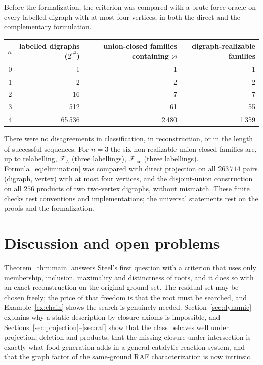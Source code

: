 \documentclass[11pt,a4paper]{article}
\theoremstyle{plain}
\theoremstyle{definition}
\theoremstyle{remark}
\newcommand{\cF}{\mathcal F}
\begin{document}
Before the formalization, the criterion was compared with a brute-force oracle on every labelled digraph with at most four vertices, in both the direct and the complementary formulation.

\begin{center}
\begin{tabular}{@{}rrrr@{}}
\toprule
$n$ & labelled digraphs ($2^{n^{2}}$) & union-closed families containing $\varnothing$ & digraph-realizable families\\
\midrule
0 & 1 & 1 & 1\\
1 & 2 & 2 & 2\\
2 & 16 & 7 & 7\\
3 & 512 & 61 & 55\\
4 & 65\,536 & 2\,480 & 1\,359\\
\bottomrule
\end{tabular}
\end{center}

There were no disagreements in classification, in reconstruction, or in the length of successful sequences. For $n=3$ the six non-realizable union-closed families are, up to relabelling, $\cF_\wedge$ (three labellings), $\cF_{\mathrm{loc}}$ (three labellings). Formula~\eqref{eq:elimination} was compared with direct projection on all $263\,714$ pairs (digraph, vertex) with at most four vertices, and the disjoint-union construction on all $256$ products of two two-vertex digraphs, without mismatch. These finite checks test conventions and implementations; the universal statements rest on the proofs and the formalization.

\section{Discussion and open problems}\label{sec:discussion}

Theorem~\ref{thm:main} answers Steel's first question with a criterion that uses only membership, inclusion, maximality and distinctness of roots, and it does so with an exact reconstruction on the original ground set. The residual set may be chosen freely; the price of that freedom is that the root must be searched, and Example~\ref{ex:chain} shows the search is genuinely needed. Section~\ref{sec:dynamic} explains why a static description by closure axioms is impossible, and Sections~\ref{sec:projection}--\ref{sec:raf} show that the class behaves well under projection, deletion and products, that the missing closure under intersection is exactly what food generation adds in a general catalytic reaction system, and that the graph factor of the same-ground RAF characterization is now intrinsic.
\end{document}
